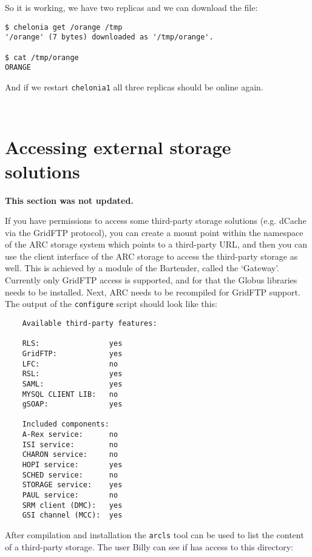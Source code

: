 \documentclass{article}
\begin{document}
So it is working, we have two replicas and we can download the file:

\begin{verbatim}
$ chelonia get /orange /tmp
'/orange' (7 bytes) downloaded as '/tmp/orange'.

$ cat /tmp/orange 
ORANGE
\end{verbatim}

And if we restart \verb!chelonia1! all three replicas should be online again.

\begin{verbatim}
    
\end{verbatim}

\section{Accessing external storage solutions} %
\label{sec:using_the_gateway}

\textbf{This section was not updated.}

If you have permissions to access some third-party storage solutions (e.g. dCache via the GridFTP protocol), you can create a mount point within the namespace of the ARC storage system which points to a third-party URL, and then you can use the client interface of the ARC storage to access the third-party storage as well. This is achieved by a module of the Bartender, called the `Gateway'. Currently only GridFTP access is supported, and for that the Globus libraries needs to be installed. Next, ARC needs to be recompiled for GridFTP support. The output of the \verb!configure! script should look like this:

\begin{verbatim}
    Available third-party features:

    RLS:                yes
    GridFTP:            yes
    LFC:                no
    RSL:                yes
    SAML:               yes
    MYSQL CLIENT LIB:   no
    gSOAP:              yes

    Included components:
    A-Rex service:      no
    ISI service:        no
    CHARON service:     no
    HOPI service:       yes
    SCHED service:      no
    STORAGE service:    yes
    PAUL service:       no
    SRM client (DMC):   yes
    GSI channel (MCC):  yes
\end{verbatim}

After compilation and installation the \verb!arcls! tool can be used to list the content of a third-party storage. The user Billy can see if has access to this directory:
\end{document}
